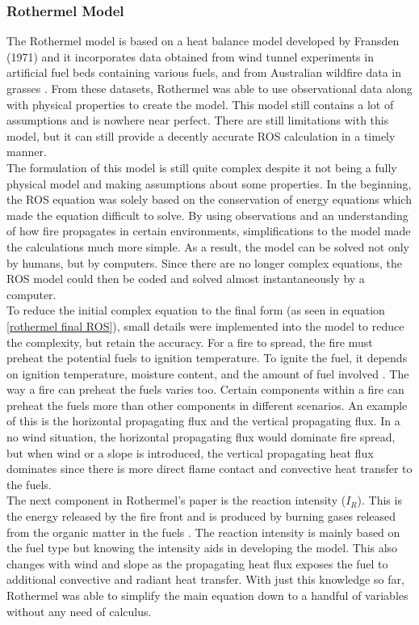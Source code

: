 \documentclass{article}
\begin{document}
\subsubsection{Rothermel Model}
\indent The Rothermel model is based on a heat balance model developed by Fransden (1971) and it incorporates data obtained from wind tunnel experiments in artificial fuel beds containing various fuels, and from Australian wildfire data in grasses \cite{Anderson2010}. From these datasets, Rothermel was able to use observational data along with physical properties to create the model. This model still contains a lot of assumptions and is nowhere near perfect. There are still limitations with this model, but it can still provide a decently accurate ROS calculation in a timely manner. \\
\indent The formulation of this model is still quite complex despite it not being a fully physical model and making assumptions about some properties. In the beginning, the ROS equation was solely based on the conservation of energy equations which made the equation difficult to solve. By using observations and an understanding of how fire propagates in certain environments, simplifications to the model made the calculations much more simple. As a result, the model can be solved not only by humans, but by computers. Since there are no longer complex equations, the ROS model could then be coded and solved almost instantaneously by a computer. \\
\indent To reduce the initial complex equation to the final form (as seen in equation \ref{rothermel final ROS}), small details were implemented into the model to reduce the complexity, but retain the accuracy. For a fire to spread, the fire must preheat the potential fuels to ignition temperature. To ignite the fuel, it depends on ignition temperature, moisture content, and the amount of fuel involved \cite{Rothermel1972}. The way a fire can preheat the fuels varies too. Certain components within a fire can preheat the fuels more than other components in different scenarios. An example of this is the horizontal propagating flux and the vertical propagating flux. In a no wind situation, the horizontal propagating flux would dominate fire spread, but when wind or a slope is introduced, the vertical propagating heat flux dominates since there is more direct flame contact and convective heat transfer to the fuels. \\
\indent The next component in Rothermel’s paper is the reaction intensity ($I_R$). This is the energy released by the fire front and is produced by burning gases released from the organic matter in the fuels \cite{Rothermel1972}. The reaction intensity is mainly based on the fuel type but knowing the intensity aids in developing the model. This also changes with wind and slope as the propagating heat flux exposes the fuel to additional convective and radiant heat transfer. With just this knowledge so far, Rothermel was able to simplify the main equation down to a handful of variables without any need of calculus.\\
\end{document}
